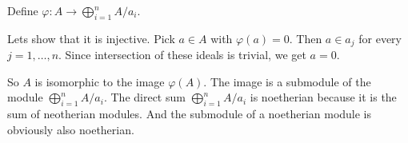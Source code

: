 \newcommand{\sheet}{5}




\maketitle

\begin{exercise}{1}

    Define $\varphi \colon A \rightarrow \bigoplus^n_{i=1} A / a_i$.

    Lets show that it is injective. Pick $a \in A$ with $\varphi(a) = 0$. Then
    $a \in a_j$ for every $j = 1, \ldots, n$. Since intersection of these ideals
    is trivial, we get $a = 0$.

    So $A$ is isomorphic to the image $\varphi(A)$. The image is a submodule of
    the module $\bigoplus^n_{i=1} A / a_i$. The direct sum $\bigoplus^n_{i=1} A
    / a_i$ is noetherian because it is the sum of neotherian modules. And the
    submodule of a noetherian module is obviously also noetherian.
\end{exercise}



